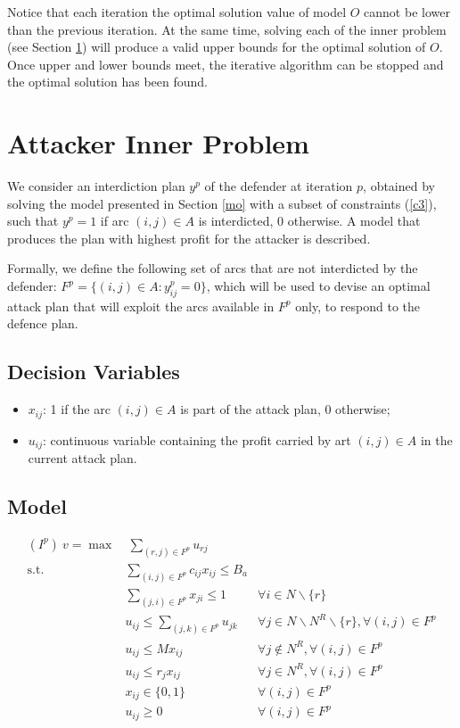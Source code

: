 \documentclass{article}
\begin{document}
Notice that each iteration the optimal solution value of model $O$ cannot be lower than the previous iteration. At the same time, solving each of the inner problem (see Section \ref{in}) will produce a valid upper bounds for the optimal solution of $O$. Once upper and lower bounds meet, the iterative algorithm can be stopped and the optimal solution has been found.

\section{Attacker Inner Problem}\label{in}

We consider an interdiction plan $y^p$ of the defender at iteration $p$, obtained by solving the model presented in Section \ref{mo} with a subset of constraints (\ref{c3}), such that  $y^p=1$ if arc $(i,j) \in A$ is interdicted, $0$ otherwise. A model that produces the plan with highest profit for the attacker is described. 

Formally, we define the following set of arcs that are not interdicted by the defender: $F^p=  \{(i,j) \in A: y^p_{ij}=0\}$, which will be used to devise an optimal attack plan that will exploit the arcs available in $F^p$ only, to respond to the defence plan. 

\subsection{Decision Variables}
\begin{itemize}
    \item $x_{ij}$: 1 if the arc $(i,j) \in A$ is part of the attack plan, 0 otherwise;
    \item $u_{ij}$: continuous variable containing the profit carried by art $(i,j) \in A$ in the current attack plan.
\end{itemize}

\subsection{Model}

\begin{align}
    (I^p) \ v= \max &\ \sum_{(r,j) \in F^p} u_{rj} \label{d0}  \\
    \text{s.t.\ } & \sum_{(i,j) \in F^p} c_{ij} x_{ij} \leq B_a \label{d1} \\
    & \sum_{(j,i) \in F^p} x_{ji} \leq 1 & \forall i \in N  \backslash \{r\} \label{d2} \\
    & u_{ij} \leq \sum_{(j,k) \in F^p} u_{jk} & \forall j \in N \backslash N^R \backslash \{r\}, \forall (i,j) \in F^p \label{d3} \\
    & u_{ij} \leq M x_{ij} & \forall j \notin N^R,  \forall (i,j) \in F^p \label{d4} \\
    & u_{ij} \leq r_j x_{ij} & \forall j \in N^R, \forall (i,j) \in F^p \label{d5} \\
    & x_{ij}  \in \{0,1\} & \forall (i,j) \in F^p \label{d6} \\
    & u_{ij} \ge 0 & \forall (i,j) \in F^p \label{d7}
\end{align}
\end{document}
